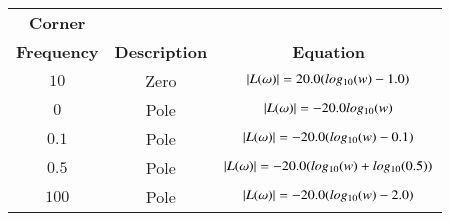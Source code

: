 \begin{tabular}{|c|c|c|}
\hline
     \textbf{Corner}&&\\ \textbf{Frequency} & \textbf{Description} & \textbf{Equation} \\
     \hline
     $10$ &  Zero & $\left\vert L(\omega)\right\vert = 20.0 (log_{10}(w) - 1.0)$\\
     \hline
     $0$ & Pole & $\left\vert L(\omega)\right\vert = -20.0 log_{10}(w)$\\
     \hline
     $0.1$ & Pole & $\left\vert L(\omega)\right\vert = -20.0 (log_{10}(w) - 0.1)$\\
     \hline
     $0.5$ & Pole & $\left\vert L(\omega)\right\vert = -20.0 (log_{10}(w) + log_{10}(0.5))$\\
     \hline
     $100$ & Pole & $\left\vert L(\omega)\right\vert = -20.0 (log_{10}(w) - 2.0)$\\
     \hline
\end{tabular}
